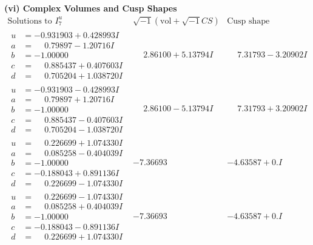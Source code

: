 \documentclass[1p]{elsarticle_modified}
\theoremstyle{definition}
\newcommand{\I}{\sqrt{-1}}
\begin{document}
\newpage\flushleft \textbf{(vi) Complex Volumes and Cusp Shapes}
$$\begin{array}{c|c|c}  
\text{Solutions to }I^u_{7}& \I (\text{vol} + \sqrt{-1}CS) & \text{Cusp shape}\\
 \hline 
\begin{aligned}
u &= -0.931903 + 0.428993 I \\
a &= \phantom{-}0.79897 - 1.20716 I \\
b &= -1.00000\phantom{ +0.000000I} \\
c &= \phantom{-}0.885437 + 0.407603 I \\
d &= \phantom{-}0.705204 + 1.038720 I\end{aligned}
 & \phantom{-}2.86100 + 5.13794 I & \phantom{-}7.31793 - 3.20902 I \\ \hline\begin{aligned}
u &= -0.931903 - 0.428993 I \\
a &= \phantom{-}0.79897 + 1.20716 I \\
b &= -1.00000\phantom{ +0.000000I} \\
c &= \phantom{-}0.885437 - 0.407603 I \\
d &= \phantom{-}0.705204 - 1.038720 I\end{aligned}
 & \phantom{-}2.86100 - 5.13794 I & \phantom{-}7.31793 + 3.20902 I \\ \hline\begin{aligned}
u &= \phantom{-}0.226699 + 1.074330 I \\
a &= \phantom{-}0.085258 - 0.404039 I \\
b &= -1.00000\phantom{ +0.000000I} \\
c &= -0.188043 + 0.891136 I \\
d &= \phantom{-}0.226699 - 1.074330 I\end{aligned}
 & -7.36693\phantom{ +0.000000I} & -4.63587 + 0. I\phantom{ +0.000000I} \\ \hline\begin{aligned}
u &= \phantom{-}0.226699 - 1.074330 I \\
a &= \phantom{-}0.085258 + 0.404039 I \\
b &= -1.00000\phantom{ +0.000000I} \\
c &= -0.188043 - 0.891136 I \\
d &= \phantom{-}0.226699 + 1.074330 I\end{aligned}
 & -7.36693\phantom{ +0.000000I} & -4.63587 + 0. I\phantom{ +0.000000I} \\ \hline\begin{aligned}

\end{aligned}
\end{array}$$
\end{document}
